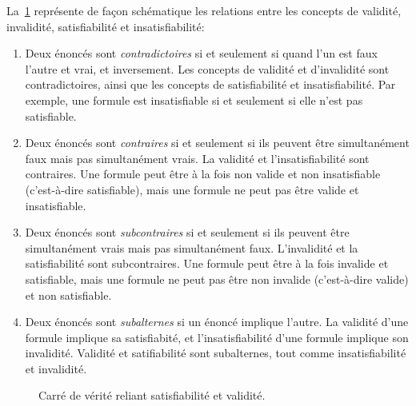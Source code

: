 La~\cref{fig_carre} représente de façon schématique les relations entre les concepts de validité, invalidité, satisfiabilité et insatisfiabilité:
\begin{enumerate}
\item Deux énoncés sont \og \textit{contradictoires} \fg{} si et seulement si quand l'un est faux l'autre et vrai, et inversement. Les concepts de validité et d'invalidité sont contradictoires, ainsi que les concepts de satisfiabilité et insatisfiabilité. Par exemple, une formule est insatisfiable si et seulement si elle n'est pas satisfiable.
\item Deux énoncés sont \og \textit{contraires} \fg{} si et seulement si ils peuvent être simultanément faux mais pas simultanément vrais.
La validité et l'insatisfiabilité sont contraires. Une formule peut être à la fois non valide et non insatisfiable (c'est-à-dire satisfiable), mais une formule ne peut pas être valide et insatisfiable.
\item Deux énoncés sont \og \textit{subcontraires} \fg{} si et seulement si ils peuvent être simultanément vrais mais pas simultanément faux.
L'invalidité et la satisfiabilité sont subcontraires. Une formule peut être à la fois invalide et satisfiable, mais une formule ne peut pas être non invalide (c'est-à-dire valide) et non satisfiable.
\item Deux énoncés sont \og \textit{subalternes} \fg{} si un énoncé implique l'autre. La validité d'une formule implique sa satisfiabité, et l'insatisfiabilité d'une formule implique son invalidité. Validité et satifiabilité sont subalternes, tout comme insatisfiabilité et invalidité.
\end{enumerate}


\begin{figure}[h]
\begin{center}
\end{center}
\caption{Carré de vérité reliant satisfiabilité et validité.}
\label{fig_carre}
\end{figure}

